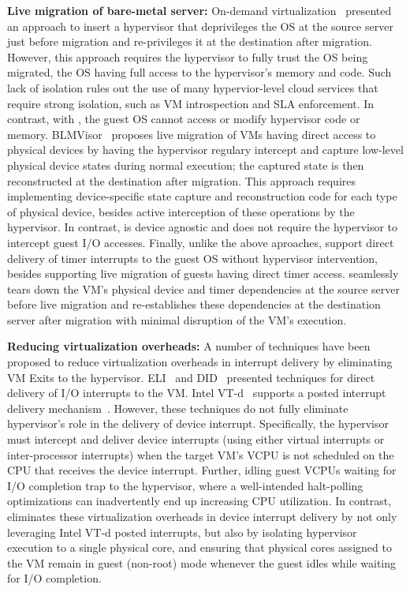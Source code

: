 {\bf Live migration of bare-metal server:} 
On-demand virtualization~\cite{ondemand} presented an approach
to insert a hypervisor that deprivileges the OS at the 
source server just before migration and re-privileges it
at the destination after migration. However, this approach 
requires the hypervisor to fully trust the OS being migrated, 
the OS having full access to the hypervisor's memory and code.
Such lack of isolation rules out the use of many hypervior-level
cloud services that require strong isolation, such as VM introspection
and SLA enforcement. In contrast, with \na, the guest OS 
cannot access or modify hypervisor code or memory.
BLMVisor~\cite{blmvisor,blmvisor-journal} proposes live migration of VMs 
having direct access to physical devices by having the hypervisor
regulary intercept and capture low-level physical device states
during normal execution; the captured state is then reconstructed
at the destination after migration. This approach requires
implementing device-specific state capture and reconstruction code 
for each type of physical device, besides active 
interception of these operations by the hypervisor. 
In contrast, \na is device agnostic and does not require
the hypervisor to intercept guest I/O accesses.
Finally, unlike the above aproaches,
\na support direct delivery of timer interrupts 
to the guest OS without hypervisor intervention, besides supporting
live migration of guests having direct timer access.
\na seamlessly tears down the VM's
physical device and timer dependencies  at the source server before live migration and 
re-establishes these dependencies at the destination server after migration
with minimal disruption of the VM's execution.


{\bf Reducing virtualization overheads:}
A number of techniques have been proposed to reduce virtualization
overheads in interrupt delivery by eliminating VM Exits to the hypervisor.
ELI~\cite{amit:2015} and DID~\cite{tu:2015} presented techniques
for direct delivery of I/O interrupts to the VM. 
Intel VT-d~\cite{intelvtd-paper,intelvtd-manual} supports a posted interrupt delivery mechanism~\cite{postedinterrupt}.
However, these techniques do not fully eliminate hypervisor's role
in the delivery of device interrupt.
Specifically, the hypervisor must intercept and deliver device interrupts
(using either virtual interrupts or inter-processor interrupts)
when the target VM's VCPU is not scheduled on the CPU
that receives the device interrupt. Further, idling guest VCPUs
waiting for I/O completion trap to the hypervisor, where a well-intended
halt-polling optimizations can inadvertently end up increasing CPU utilization.
In contrast, \na eliminates these virtualization
overheads in device interrupt delivery by not only leveraging
Intel VT-d posted interrupts, but also by isolating  hypervisor execution 
to a single physical core, and ensuring that physical 
cores assigned to the VM remain in guest (non-root) 
mode whenever the guest idles while waiting for I/O completion.

